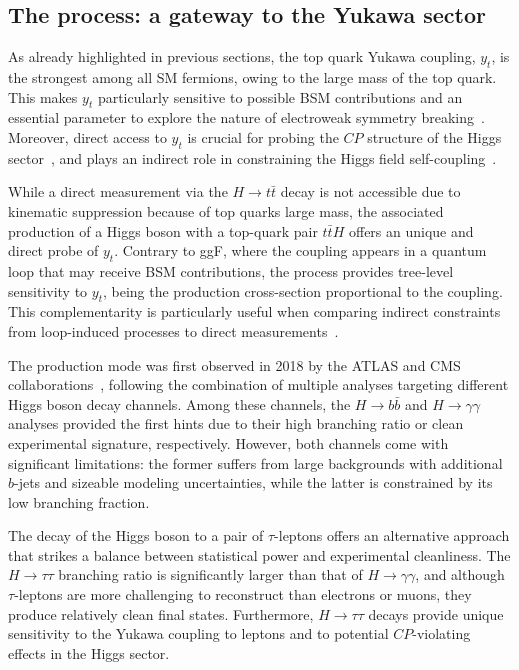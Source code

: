 \subsection{The \ttH process: a gateway to the Yukawa sector}
\label{sec:ttH}
As already highlighted in previous sections, the top quark Yukawa coupling, $y_t$, is the strongest among all SM fermions, owing to the large mass of the top quark. This makes $y_t$ particularly sensitive to possible BSM contributions and an essential parameter to explore the nature of electroweak symmetry breaking~\cite{Englert:2014uua,Dobrescu:1997nm,Chivukula:1998wd,Delepine:1995qs}. Moreover, direct access to $y_t$ is crucial for probing the $CP$ structure of the Higgs sector~\cite{Bernreuther:2002uj,Brod:2013cka}, and plays an indirect role in constraining the Higgs field self-coupling~\cite{Buttazzo:2013uya,Degrassi:2016wml}.

While a direct measurement via the $H\to t\bar{t}$ decay is not accessible due to kinematic suppression because of top quarks large mass, the associated production of a Higgs boson with a top-quark pair $t\bar{t}H$ offers an unique and direct probe of $y_t$. Contrary to ggF, where the coupling appears in a quantum loop that may receive BSM contributions, the \ttH process provides tree-level sensitivity to $y_t$, being the production cross-section proportional to the coupling. This complementarity is particularly useful when comparing indirect constraints from loop-induced processes to direct measurements~\cite{Ng:1983jm,Kunszt:1984ri,Beenakker:2001rj}.

The \ttH production mode was first observed in 2018 by the ATLAS and CMS collaborations~\cite{ATLAS:2018mme,CMS:2018uxb}, following the combination of multiple analyses targeting different Higgs boson decay channels. Among these channels, the $H\to b \bar{b}$ and $H\to \gamma \gamma$ analyses provided the first hints due to their high branching ratio or clean experimental signature, respectively. However, both channels come with significant limitations: the former suffers from large backgrounds with additional $b$-jets and sizeable modeling uncertainties, while the latter is constrained by its low branching fraction.

The decay of the Higgs boson to a pair of $\tau$-leptons offers an alternative approach that strikes a balance between statistical power and experimental cleanliness. The $H\to\tau\tau$ branching ratio is significantly larger than that of $H\to \gamma \gamma$, and although $\tau$-leptons are more challenging to reconstruct than electrons or muons, they produce relatively clean final states. Furthermore, $H\to\tau\tau$ decays provide unique sensitivity to the Yukawa coupling to leptons and to potential $CP$-violating effects in the Higgs sector.

